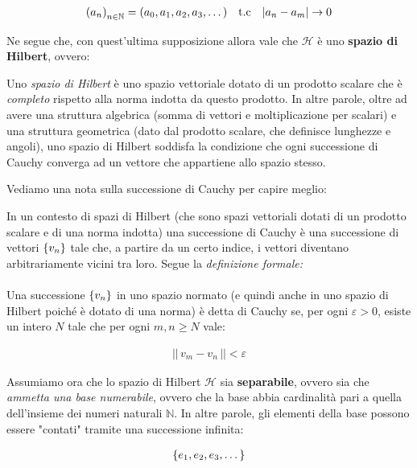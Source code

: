 \begin{align*}
	\qty(a_n)_{n \in \mathbb{N}} = \qty(a_0, a_1, a_2, a_3, \dots) \quad \text{t.c} \quad |a_n - a_m| \to 0
\end{align*}

	Ne segue che, con quest'ultima supposizione allora vale che $\mathcal{H}$ è uno \textbf{spazio di Hilbert}, ovvero:
	
\begin{mydef}
	Uno \textit{spazio di Hilbert} è uno spazio vettoriale dotato di un prodotto scalare che è \textit{completo} rispetto alla norma indotta da questo prodotto. In altre parole, oltre ad avere una struttura algebrica (somma di vettori e moltiplicazione per scalari) e una struttura geometrica (dato dal prodotto scalare, che definisce lunghezze e angoli), uno spazio di Hilbert soddisfa la condizione che ogni successione di Cauchy converga ad un vettore che appartiene allo spazio stesso.
\end{mydef}

	Vediamo una nota sulla successione di Cauchy per capire meglio:
	
\begin{myapprf}

	In un contesto di spazi di Hilbert (che sono spazi vettoriali dotati di un prodotto scalare e di una norma indotta) una successione di Cauchy è una successione di vettori $\qty{v_n}$ tale che, a partire da un certo indice, i vettori diventano arbitrariamente vicini tra loro. Segue la \textit{definizione formale:}
	\\
	\\
	Una successione $\qty{v_n}$ in uno spazio normato (e quindi anche in uno spazio di Hilbert poiché è dotato di una norma) è detta di Cauchy se, per ogni $\varepsilon > 0$, esiste un intero $N$ tale che per ogni $m, n \geq N$ vale:
	
\begin{align*}
	||\, v_m - v_n \, || < \varepsilon
\end{align*}

\end{myapprf}

	Assumiamo ora che lo spazio di Hilbert $\mathcal{H}$ sia \textbf{separabile}, ovvero sia che \textit{ammetta una base numerabile}, ovvero che la base abbia cardinalità pari a quella dell'insieme dei numeri naturali $\mathbb{N}$. In altre parole, gli elementi della base possono essere "contati" tramite una successione infinita:

\begin{align*}
	\qty{e_1, e_2, e_3,  \dots}
\end{align*}

